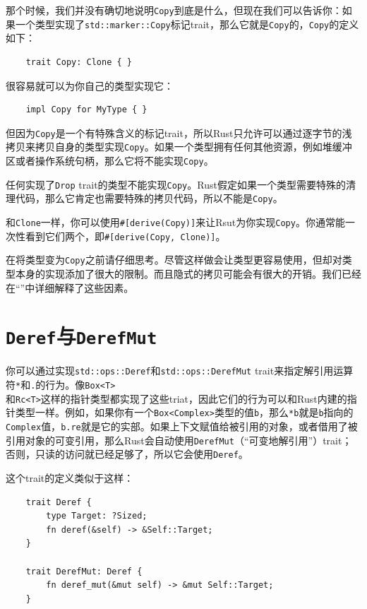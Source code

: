 那个时候，我们并没有确切地说明\texttt{Copy}到底是什么，但现在我们可以告诉你：如果一个类型实现了\texttt{std::marker::Copy}标记trait，那么它就是\texttt{Copy}的，\texttt{Copy}的定义如下：
\begin{verbatim}
    trait Copy: Clone { }
\end{verbatim}

很容易就可以为你自己的类型实现它：
\begin{verbatim}
    impl Copy for MyType { }
\end{verbatim}

但因为\texttt{Copy}是一个有特殊含义的标记trait，所以Rust只允许可以通过逐字节的浅拷贝来拷贝自身的类型实现\texttt{Copy}。如果一个类型拥有任何其他资源，例如堆缓冲区或者操作系统句柄，那么它将不能实现\texttt{Copy}。

任何实现了\texttt{Drop} trait的类型不能实现\texttt{Copy}。Rust假定如果一个类型需要特殊的清理代码，那么它肯定也需要特殊的拷贝代码，所以不能是\texttt{Copy}。

和\texttt{Clone}一样，你可以使用\texttt{\#[derive(Copy)]}来让Rsut为你实现\texttt{Copy}。你通常能一次性看到它们两个，即\texttt{\#[derive(Copy, Clone)]}。

在将类型变为\texttt{Copy}之前请仔细思考。尽管这样做会让类型更容易使用，但却对类型本身的实现添加了很大的限制。而且隐式的拷贝可能会有很大的开销。我们已经在“”中详细解释了这些因素。

\section{\texttt{Deref}与\texttt{DerefMut}}\label{deref}

你可以通过实现\texttt{std::ops::Deref}和\texttt{std::ops::DerefMut} trait来指定解引用运算符\texttt{*}和\texttt{.}的行为。像\texttt{Box<T>}\\
和\texttt{Rc<T>}这样的指针类型都实现了这些triat，因此它们的行为可以和Rust内建的指针类型一样。例如，如果你有一个\texttt{Box<Complex>}类型的值\texttt{b}，那么\texttt{*b}就是\texttt{b}指向的\texttt{Complex}值，\texttt{b.re}就是它的实部。如果上下文赋值给被引用的对象，或者借用了被引用对象的可变引用，那么Rust会自动使用\texttt{DerefMut}（“可变地解引用”）trait；否则，只读的访问就已经足够了，所以它会使用\texttt{Deref}。

这个trait的定义类似于这样：
\begin{verbatim}
    trait Deref {
        type Target: ?Sized;
        fn deref(&self) -> &Self::Target;
    }

    trait DerefMut: Deref {
        fn deref_mut(&mut self) -> &mut Self::Target;
    }
\end{verbatim}

